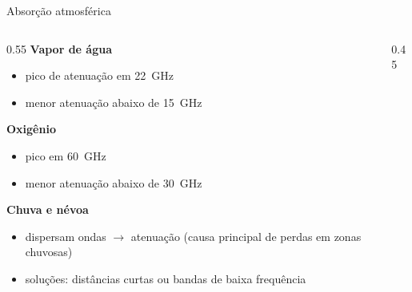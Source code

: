 \documentclass[aspectratio=169,11pt]{beamer}
\begin{document}
\begin{frame}{Absorção atmosférica}
  \begin{columns}
    \begin{column}{0.55\textwidth}
      \textbf{Vapor de água}
      \begin{itemize}
        \item pico de atenuação em 22~GHz
        \item menor atenuação abaixo de 15~GHz
      \end{itemize}
      \textbf{Oxigênio}
      \begin{itemize}
        \item pico em 60~GHz
        \item menor atenuação abaixo de 30~GHz
      \end{itemize}
      \textbf{Chuva e névoa}
      \begin{itemize}
        \item dispersam ondas $\rightarrow$ atenuação (causa principal de perdas em zonas chuvosas)
        \item soluções: distâncias curtas ou bandas de baixa frequência
      \end{itemize}
    \end{column}
    \begin{column}{0.45\textwidth}
      \begin{center}
      \end{center}
    \end{column}
  \end{columns}
\end{frame}
\end{document}

